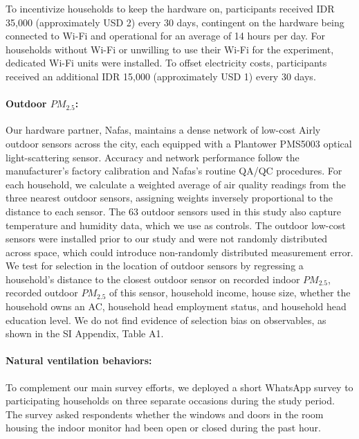 \documentclass[9pt,twocolumn,twoside]{pnas-new}
\begin{document}
To incentivize households to keep the hardware on, participants received IDR 35,000 (approximately USD 2) every 30 days, contingent on the hardware being connected to Wi-Fi and operational for an average of 14 hours per day. For households without Wi-Fi or unwilling to use their Wi-Fi for the experiment, dedicated Wi-Fi units were installed. To offset electricity costs, participants received an additional IDR 15,000 (approximately USD 1) every 30 days.

\paragraph{Outdoor $PM_{2.5}$:} Our hardware partner, Nafas, maintains a dense network of low-cost Airly outdoor sensors across the city, each equipped with a Plantower PMS5003 optical light-scattering sensor. Accuracy and network performance follow the manufacturer’s factory calibration and Nafas’s routine QA/QC procedures. For each household, we calculate a weighted average of air quality readings from the three nearest outdoor sensors, assigning weights inversely proportional to the distance to each sensor. The 63 outdoor sensors used in this study also capture temperature and humidity data, which we use as controls. The outdoor low-cost sensors were installed prior to our study and were not randomly distributed across space, which could introduce non-randomly distributed measurement error. We test for selection in the location of outdoor sensors by regressing a household's distance to the closest outdoor sensor on recorded indoor $PM_{2.5}$, recorded outdoor $PM_{2.5}$ of this sensor, household income, house size, whether the household owns an AC, household head employment status, and household head education level. We do not find evidence of selection bias on observables, as shown in the SI Appendix, Table A1.

\paragraph{Natural ventilation behaviors:} To complement our main survey efforts, we deployed a short WhatsApp survey to participating households on three separate occasions during the study period. The survey asked respondents whether the windows and doors in the room housing the indoor monitor had been open or closed during the past hour.
\end{document}
